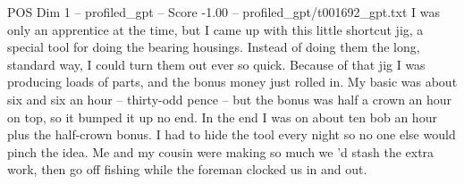 \begin{textsample}{POS Dim 1 – profiled\_gpt – Score -1.00 – profiled\_gpt/t001692\_gpt.txt}  \label{ex:f1_pos_040}
I was only an apprentice at the time, but I came up with this little shortcut jig, a special tool for doing the bearing housings.
Instead of doing them the long, standard way, I could turn them out ever so quick.
Because of that jig I was producing loads of parts, and the bonus money just rolled in.
My basic was about six and six an hour – thirty-odd pence – but the bonus was half a crown an hour on top, so it bumped it up no end.
In the end I was on about ten bob an hour plus the half-crown bonus.
I had to hide the tool every night so no one else would pinch the idea.
Me and my cousin were making so much we ’d stash the extra work, then go off fishing while the foreman clocked us in and out.

\end{textsample}
